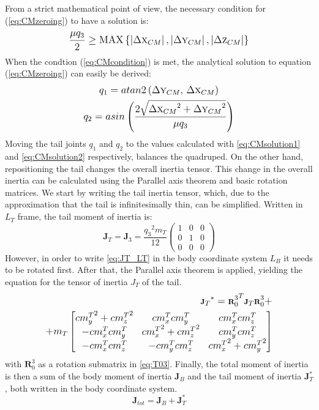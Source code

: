 From a strict mathematical point of view, the necessary condition for (\ref{eq:CMzeroing}) to have a solution is:
\begin{equation}\label{eq:CMcondition}
\frac{\mu q_3}{2}\geq \textup{MAX}\left \{ \left | \Delta \textsc{x}_{CM} \right |, \left | \Delta \textsc{y}_{CM} \right |,\left | \Delta \textsc{z}_{CM} \right |\right \}
\end{equation}
When the condtion (\ref{eq:CMcondition}) is met, the analytical solution to equation (\ref{eq:CMzeroing}) can easily be derived:
\begin{gather}\label{eq:CMsolution1}
q_1=atan2\left({\Delta \textsc{y}_{CM}},\, {\Delta \textsc{x}_{CM}}\right)\\
q_2=asin\left(\frac{2\sqrt{{\Delta \textsc{x}_{CM}}^2+{\Delta \textsc{y}_{CM}}^2}}{\mu q_3} \right)\label{eq:CMsolution2}
\end{gather}
Moving the tail joints $q_1$ and $q_2$ to the values calculated with \eqref{eq:CMsolution1} and \eqref{eq:CMsolution2} respectively, balances the quadruped. On the other hand, repositioning the tail changes the overall inertia tensor. This change in the overall inertia can be calculated using the Parallel axis theorem and basic rotation matrices. We start by writing the tail inertia tensor, which, due to the approximation that the tail is infinitesimally thin, can be simplified. Written in $L_T$ frame, the tail moment of inertia is:
\begin{equation}\label{eq:JT_LT}
\textbf{J}_T=\textbf{J}_3=\frac{{q_3}^2 m_T}{12}\left(
\begin{array}{ccc}
 1 & 0 & 0 \\
 0 & 1 & 0 \\
 0 & 0 & 0
\end{array}
\right)
\end{equation}
However, in order to write \eqref{eq:JT_LT} in the body coordinate system $L_B$ it needs to be rotated first. After that, the Parallel axis theorem is applied, yielding the equation for the tensor of inertia $J_T$ of the tail. 
\begin{equation}
\begin{aligned}
\scriptsize
{\textbf{J}_T}^*={\textbf{R}_0^3}^T\textbf{J}_T\textbf{R}_0^3+\\+m_T\begin{bmatrix}
{cm_y^T}^2 +{cm_z^T}^2& {cm_x^T}{cm_y^T}& {cm_x^T}{cm_z^T} \\ 
-{cm_x^T}{cm_y^T} & {cm_x^T}^2+{cm_z^T}^2 & {cm_y^T}{cm_z^T}\\ 
-{cm_x^T}{cm_z^T} & -{cm_y^T}{cm_z^T} & {cm_x^T}^2+{cm_y^T}^2
\end{bmatrix}
\normalsize
\end{aligned}
\end{equation}
with $\textbf{R}_0^3$ as a rotation submatrix in \eqref{eq:T03}. Finally, the total moment of inertia is then a sum of the body moment of inertia $\textbf{J}_B$ and the tail moment of inertia $\textbf{J}_T^*$, both written in the body coordinate system.
\begin{equation*}
\textbf{J}_{tot}=\textbf{J}_B+\textbf{J}_T^*
\end{equation*}
